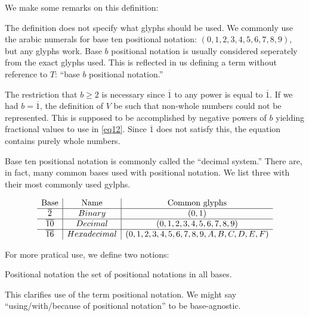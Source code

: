 \documentclass{article}
\begin{document}
	We make some remarks on this definition:
	
	\begin{remark}
		The definition does not specify what glyphs should be used. We commonly use the arabic numerals for base ten positional notation: $(0, 1, 2, 3, 4, 5, 6, 7, 8, 9)$, but any glyphs work. Base $b$ positional notation is usually considered seperately from the exact glyphs used. This is reflected in us defining a term without reference to $T$: ``base $b$ positional notation.''
	\end{remark}
		
	\begin{remark}
		The restriction that $b\geq 2$ is necessary since $\overline{1}$ to any power is equal to $\overline{1}$. If we had $b=\overline{1}$, the definition of $V$ be such that non-whole numbers could not be represented. This is supposed to be accomplished by negative powers of $b$ yielding fractional values to use in \ref{eq12}. Since $\overline{1}$ does not satisfy this, the equation contains purely whole numbers.
	\end{remark}
	
	Base ten positional notation is commonly called the ``decimal system.'' There are, in fact, many common bases used with positional notation. We list three with their most commonly used gylphs.
	
	\begin{equation}
		\begin{array}{c | c | c}
			\text{Base} & \text{Name} & \text{Common glyphs}\\
			\hline
			\overline{2} & Binary & \pqty{0, 1}\\
			\hline
			\overline{10} & Decimal & \pqty{0, 1, 2, 3, 4, 5, 6, 7, 8, 9}\\
			\hline
			\overline{16} & Hexadecimal & \pqty{0, 1, 2, 3, 4, 5, 6, 7, 8, 9, A, B, C, D, E, F}
			
		\end{array}
	\end{equation}
	
	For more pratical use, we define two notions:
	
	\begin{definition}
		Positional notation the set of positional notations in all bases.
	\end{definition}
	\begin{remark}
		This clarifies use of the term positional notation. We might say ``using/with/because of positional notation'' to be base-agnostic.
	\end{remark}
	
\end{document}
